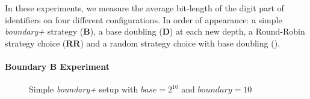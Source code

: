 In these experiments, we measure the average bit-length of the digit part of
identifiers on four different configurations. In order of appearance: a simple
\emph{boundary+} strategy (\textbf{B}), a base doubling (\textbf{D}) at each
new depth, a Round-Robin strategy choice (\textbf{RR}) and a random strategy
choice with base doubling (\textbf{\NAME}).

\paragraph{Boundary \textbf{B} Experiment}

\begin{figure}
\begin{center}
\small

\caption{Simple \emph{boundary+} setup with $base=2^{10}$ and $boundary=10$}
\label{fig:dimlogexperiment}
\end{center}
\end{figure}

